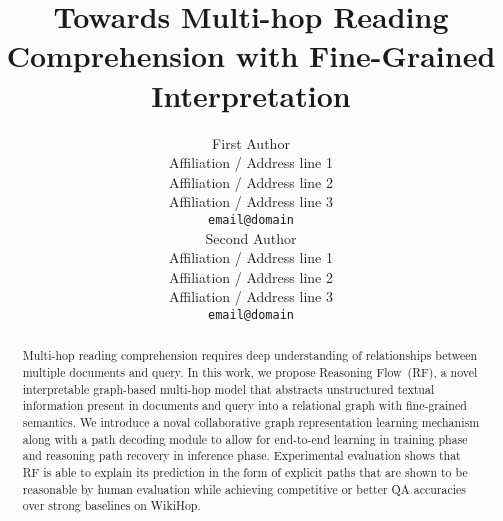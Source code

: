 \documentclass[11pt,a4paper]{article}
\title{Towards Multi-hop Reading Comprehension with Fine-Grained Interpretation}
\author{First Author \\
  Affiliation / Address line 1 \\
  Affiliation / Address line 2 \\
  Affiliation / Address line 3 \\
  \texttt{email@domain} \\\And
  Second Author \\
  Affiliation / Address line 1 \\
  Affiliation / Address line 2 \\
  Affiliation / Address line 3 \\
  \texttt{email@domain} \\}
\date{}
\newcommand{\KZ}[1]{\textcolor{blue}{Kenny: #1}}
\begin{document}
\maketitle
\begin{abstract}
Multi-hop reading comprehension requires deep understanding of relationships 
between multiple documents and query. In this work, we propose 
Reasoning Flow~(RF), a novel interpretable graph-based multi-hop model 
that abstracts unstructured textual information present in documents 
and query into a relational graph with fine-grained semantics. 
We introduce a noval collaborative graph representation learning mechanism 
along with a path decoding module to allow for end-to-end learning 
in training phase and reasoning path recovery in inference phase. 
Experimental evaluation shows that RF is able to explain its prediction 
in the form of explicit paths that are shown to be reasonable by 
human evaluation while achieving competitive or better QA accuracies over 
strong baselines on WikiHop.
\end{abstract}









\end{document}
